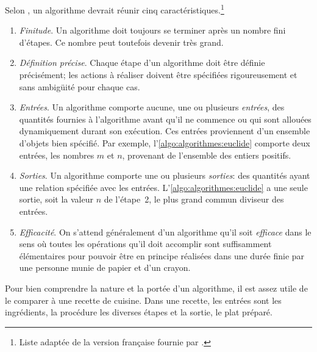 
Selon \citet[section~1.1]{Knuth:ACP:vol1:1997}, un algorithme devrait
réunir cinq caractéristiques.\footnote{%
  Liste adaptée de la version française fournie par
  \citet{Wikipedia:Algorithme}.}
\begin{enumerate}
\item \emph{Finitude}. Un algorithme doit toujours se terminer après
  un nombre fini d’étapes. Ce nombre peut toutefois devenir très
  grand.
\item \emph{Définition précise}. Chaque étape d'un algorithme doit
  être définie précisément; les actions à réaliser doivent être
  spécifiées rigoureusement et sans ambigüité pour chaque cas.
\item \emph{Entrées}. Un algorithme comporte aucune, une ou plusieurs
  \emph{entrées}, des quantités fournies à l'algorithme avant qu'il ne
  commence ou qui sont allouées dynamiquement durant son exécution.
  Ces entrées proviennent d'un ensemble d'objets bien spécifié. Par
  exemple, l'\autoref{algo:algorithmes:euclide} comporte deux entrées,
  les nombres $m$ et $n$, provenant de l'ensemble des entiers
  positifs.
\item \emph{Sorties}. Un algorithme comporte une ou plusieurs
  \emph{sorties}: des quantités ayant une relation spécifiée avec les
  entrées. L'\autoref{algo:algorithmes:euclide} a une seule sortie,
  soit la valeur $n$ de l'étape~2, le plus grand commun diviseur des
  entrées.
\item \emph{Efficacité}. On s'attend généralement d'un algorithme
  qu'il soit \emph{efficace} dans le sens où toutes les opérations
  qu'il doit accomplir sont suffisamment élémentaires pour pouvoir
  être en principe réalisées dans une durée finie par une personne
  munie de papier et d'un crayon.
\end{enumerate}

Pour bien comprendre la nature et la portée d'un algorithme, il est
assez utile de le comparer à une recette de cuisine. Dans une recette,
les entrées sont les ingrédients, la procédure les diverses étapes et
la sortie, le plat préparé.

